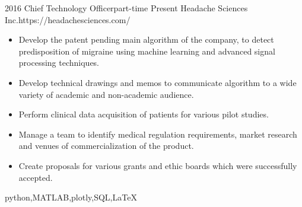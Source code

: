 \begin{experiences}
	\myExperience
	{2016}       {Chief Technology Officer}{part-time}
	{Present}      {Headache Sciences Inc.}{https://headachesciences.com/}
	{
		\begin{itemize}
			\item Develop the patent pending main algorithm of the company, to detect predisposition of migraine using machine learning and advanced signal processing techniques. 
			\item Develop technical drawings and memos to communicate algorithm to a wide variety of academic and non-academic audience. 
			\item Perform clinical data acquisition of patients for various pilot studies. 
			\item Manage a team to identify medical regulation requirements, market research and venues of commercialization of the product. 
			\item Create proposals for various grants and ethic boards which were successfully accepted.
		\end{itemize}
	}
	{python,MATLAB,plotly,SQL,\LaTeX}
	
	
%	

\end{experiences}
